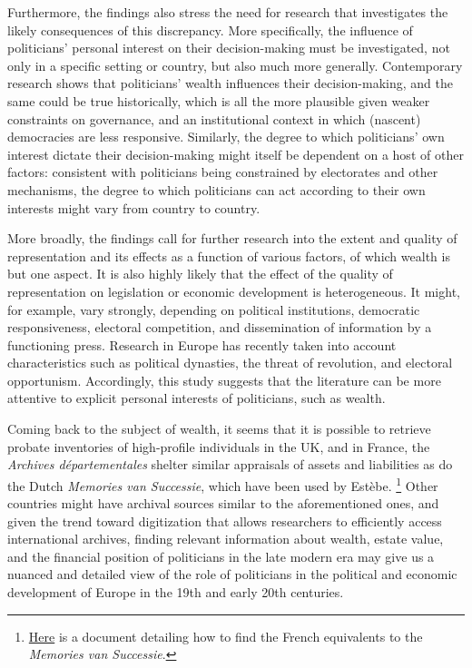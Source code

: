     Furthermore, the findings also stress the need for research that investigates the likely consequences of this discrepancy. More specifically, the influence of politicians' personal interest on their decision-making must be investigated, not only in a specific setting or country, but also much more generally. Contemporary research shows that politicians' wealth influences their decision-making, and the same could be true historically, which is all the more plausible given weaker constraints on governance, and an institutional context in which (nascent) democracies are less responsive. \autocite{tahoun2019personal} Similarly, the  degree to which politicians' own interest dictate their decision-making might itself be dependent on a host of other factors: consistent with politicians being constrained by electorates and other mechanisms, the degree to which politicians can act according to their own interests might vary from country to country. \autocite{djankov2010disclosure}

    More broadly, the findings call for further research into the extent and quality of representation and its effects as a function of various factors, of which wealth is but one aspect. It is also highly likely that the effect of the quality of representation on legislation or economic development is heterogeneous. It might, for example, vary strongly, depending on political institutions, democratic responsiveness, electoral competition, and dissemination of information by a functioning press. Research in Europe has recently taken into account characteristics such as political dynasties, the threat of revolution, and electoral opportunism. \autocite{aidt2014workers, oosterlinck2020positive, aidt2019motivates} Accordingly, this study suggests that the literature can be more attentive to explicit personal interests of politicians, such as wealth. 

    Coming back to the subject of wealth, it seems that it is possible to retrieve probate inventories of high-profile individuals in the UK, and in France, the \textit{Archives départementales} shelter similar appraisals of assets and liabilities as do the Dutch \textit{Memories van Successie}, which have been used by Estèbe.\autocite{estebe1982ministres} \autocite{bottomley2019returns} \footnote{\href{https://archives.cd08.fr/arkotheque/client/ad_ardennes/_depot_arko/articles/1834/tables-des-successions-et-absences-_doc.pdf}{Here} is a document detailing how to find the French equivalents to the \textit{Memories van Successie}.} Other countries might have archival sources similar to the aforementioned ones, and given the trend toward digitization that allows researchers to efficiently access international archives, finding relevant information about wealth, estate value, and the financial position of politicians in the late modern era may give us a nuanced and detailed view of the role of politicians in the political and economic development of Europe in the 19th and early 20th centuries. 

